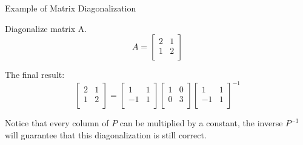 \documentclass{beamer}
\begin{document}
\begin{frame}{Example of Matrix Diagonalization}
    \begin{examples}
        Diagonalize matrix A.
        \begin{equation*}
            A=\left[ \begin{matrix}
            2&		1\\
            1&		2\\
        \end{matrix} \right]
        \end{equation*}
        \end{examples}

The final result:
    \begin{equation*}
        \left[ \begin{matrix}
            2&		1\\
            1&		2\\
        \end{matrix} \right] =\left[ \begin{matrix}
            1&		1\\
            -1&		1\\
        \end{matrix} \right] \left[ \begin{matrix}
            1&		0\\
            0&		3\\
        \end{matrix} \right] \left[ \begin{matrix}
            1&		1\\
            -1&		1\\
        \end{matrix} \right] ^{-1}
    \end{equation*}

Notice that every column of $P$ can be multiplied by a constant, the inverse $P^{-1}$ will guarantee that this diagonalization is still correct.
\end{frame}
\end{document}
